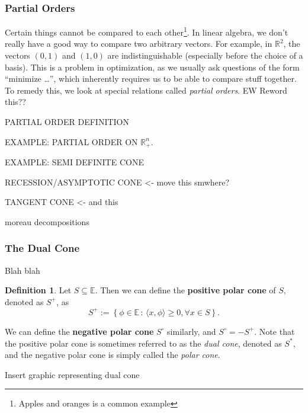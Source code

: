 \documentclass{article}
\numberwithin{equation}{section}
\theoremstyle{definition}
\newtheorem{definition}[theorem]{Definition}%
\newcommand{\bE}{\mathbb{E}}
\newcommand{\bR}{\mathbb{R}}
\newcommand{\set}[2]{\left\{#1\,:\,#2\right\}}
\begin{document}
\subsubsection{Partial Orders}
Certain things cannot be compared to each other\footnote{Apples and oranges is a common example}. In linear algebra, we don't really have a good way to compare two arbitrary vectors. For example, in $\bR^2$, the vectors $(0, 1)$ and $(1, 0)$ are indistinguishable (especially before the choice of a basis). This is a problem in optimization, as we usually ask questions of the form ``minimize \dots'', which inherently requires us to be able to compare stuff together. To remedy this, we look at special relations called \textit{partial orders}. EW Reword this??

PARTIAL ORDER DEFINITION

EXAMPLE: PARTIAL ORDER ON $\bR^n_+$.

EXAMPLE: SEMI DEFINITE CONE

RECESSION/ASYMPTOTIC CONE <- move this smwhere?

TANGENT CONE <- and this

moreau decompositions

\subsubsection{The Dual Cone}
Blah blah
\begin{definition}
    Let $S\subseteq\bE$. Then we can define the \textbf{positive polar cone} of $S$, denoted as $S^+$, as
    \begin{equation}
        S^+:=\set{\phi\in\bE}{\langle x,\phi\rangle\ge 0,\forall x\in S}.
    \end{equation}
\end{definition}
We can define the \textbf{negative polar cone} $S^\circ $ similarly, and $S^\circ=-S^+$. Note that the positive polar cone is sometimes referred to as the \textit{dual cone}, denoted as $S^*$, and the negative polar cone is simply called the \textit{polar cone}.

Insert graphic representing dual cone
\end{document}
